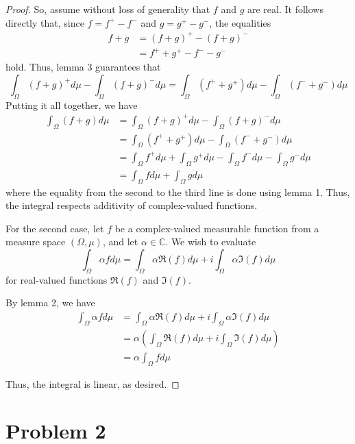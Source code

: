 \documentclass[fontsize=11pt]{scrartcl} %
\numberwithin{equation}{section} %
\numberwithin{figure}{section} %
\numberwithin{table}{section} %
\newcommand{\C}{\mathbb{C}}
\theoremstyle{definition}
\begin{document}
\begin{proof}
So, assume without loss of generality that $f$ and $g$ are real. It follows directly that,
since $f=f^+-f^-$ and $g=g^+-g^-$, the equalities
\[
\begin{aligned}
f+g &= (f+g)^+ - (f+g)^-\\
    &= f^+ + g^+ - f^- - g^-
\end{aligned}
\]
hold. Thus, lemma 3 guarantees that
\[
\int_{\Omega}(f+g)^+d\mu - \int_{\Omega}(f+g)^-d\mu = \int_{\Omega}(f^+ + g^+)d\mu -\int_{\Omega}(f^-+g^-)d\mu
\]
Putting it all together, we have
\[
\begin{aligned}
\int_{\Omega}(f+g)d\mu  &= \int_{\Omega}(f+g)^+d\mu - \int_{\Omega}(f+g)^-d\mu\\
                        &= \int_{\Omega}(f^++g^+)d\mu - \int_{\Omega}(f^-+g^-)d\mu\\
                        &= \int_{\Omega}f^+d\mu + \int_{\Omega}g^+d\mu - \int_{\Omega}f^-d\mu-\int_{\Omega}g^-d\mu\\
                        &= \int_{\Omega}fd\mu + \int_{\Omega}gd\mu
\end{aligned}
\]
where the equality from the second to the third line is done using lemma 1.
Thus, the integral respects additivity of complex-valued functions.

For the second case, let $f$ be a complex-valued measurable function from a measure space
$(\Omega,\mu)$, and let $\alpha\in\C$. We wish to evaluate
\[
\int_{\Omega}\alpha fd\mu = \int_{\Omega}\alpha\Re(f)d\mu + i\int_{\Omega}\alpha\Im(f)d\mu
\]
for real-valued functions $\Re(f)$ and $\Im(f)$.

By lemma 2, we have
\[
\begin{aligned}
\int_{\Omega}\alpha fd\mu &= \int_{\Omega}\alpha\Re(f)d\mu + i\int_{\Omega}\alpha\Im(f)d\mu\\
                            &=\alpha\left(\int_{\Omega}\Re(f)d\mu + i\int_{\Omega}\Im(f)d\mu\right)\\
                            &=\alpha\int_{\Omega}fd\mu
\end{aligned}
\]

Thus, the integral is linear, as desired.
\end{proof}

\newpage
\section*{Problem 2}
\end{document}
